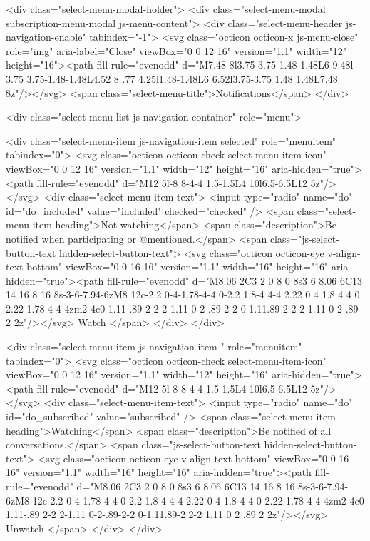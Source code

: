         <div class="select-menu-modal-holder">
          <div class="select-menu-modal subscription-menu-modal js-menu-content">
            <div class="select-menu-header js-navigation-enable" tabindex="-1">
              <svg class="octicon octicon-x js-menu-close" role="img" aria-label="Close" viewBox="0 0 12 16" version="1.1" width="12" height="16"><path fill-rule="evenodd" d="M7.48 8l3.75 3.75-1.48 1.48L6 9.48l-3.75 3.75-1.48-1.48L4.52 8 .77 4.25l1.48-1.48L6 6.52l3.75-3.75 1.48 1.48L7.48 8z"/></svg>
              <span class="select-menu-title">Notifications</span>
            </div>

              <div class="select-menu-list js-navigation-container" role="menu">

                <div class="select-menu-item js-navigation-item selected" role="menuitem" tabindex="0">
                  <svg class="octicon octicon-check select-menu-item-icon" viewBox="0 0 12 16" version="1.1" width="12" height="16" aria-hidden="true"><path fill-rule="evenodd" d="M12 5l-8 8-4-4 1.5-1.5L4 10l6.5-6.5L12 5z"/></svg>
                  <div class="select-menu-item-text">
                    <input type="radio" name="do" id="do_included" value="included" checked="checked" />
                    <span class="select-menu-item-heading">Not watching</span>
                    <span class="description">Be notified when participating or @mentioned.</span>
                    <span class="js-select-button-text hidden-select-button-text">
                      <svg class="octicon octicon-eye v-align-text-bottom" viewBox="0 0 16 16" version="1.1" width="16" height="16" aria-hidden="true"><path fill-rule="evenodd" d="M8.06 2C3 2 0 8 0 8s3 6 8.06 6C13 14 16 8 16 8s-3-6-7.94-6zM8 12c-2.2 0-4-1.78-4-4 0-2.2 1.8-4 4-4 2.22 0 4 1.8 4 4 0 2.22-1.78 4-4 4zm2-4c0 1.11-.89 2-2 2-1.11 0-2-.89-2-2 0-1.11.89-2 2-2 1.11 0 2 .89 2 2z"/></svg>
                      Watch
                    </span>
                  </div>
                </div>

                <div class="select-menu-item js-navigation-item " role="menuitem" tabindex="0">
                  <svg class="octicon octicon-check select-menu-item-icon" viewBox="0 0 12 16" version="1.1" width="12" height="16" aria-hidden="true"><path fill-rule="evenodd" d="M12 5l-8 8-4-4 1.5-1.5L4 10l6.5-6.5L12 5z"/></svg>
                  <div class="select-menu-item-text">
                    <input type="radio" name="do" id="do_subscribed" value="subscribed" />
                    <span class="select-menu-item-heading">Watching</span>
                    <span class="description">Be notified of all conversations.</span>
                    <span class="js-select-button-text hidden-select-button-text">
                      <svg class="octicon octicon-eye v-align-text-bottom" viewBox="0 0 16 16" version="1.1" width="16" height="16" aria-hidden="true"><path fill-rule="evenodd" d="M8.06 2C3 2 0 8 0 8s3 6 8.06 6C13 14 16 8 16 8s-3-6-7.94-6zM8 12c-2.2 0-4-1.78-4-4 0-2.2 1.8-4 4-4 2.22 0 4 1.8 4 4 0 2.22-1.78 4-4 4zm2-4c0 1.11-.89 2-2 2-1.11 0-2-.89-2-2 0-1.11.89-2 2-2 1.11 0 2 .89 2 2z"/></svg>
                        Unwatch
                    </span>
                  </div>
                </div>

